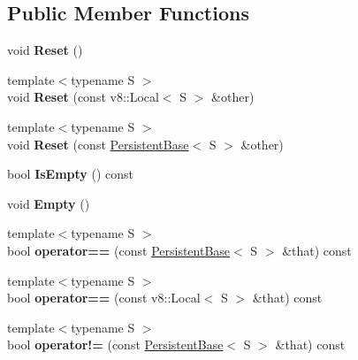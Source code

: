 \subsection*{Public Member Functions}
\begin{DoxyCompactItemize}
\item 
\mbox{\label{class_persistent_base_aea3d2d04de88357b7823be9eb788a3fa}} 
void {\bfseries Reset} ()
\item 
\mbox{\label{class_persistent_base_ac8f10d732a311ec697eb47d965789445}} 
{\footnotesize template$<$typename S $>$ }\\void {\bfseries Reset} (const v8\+::\+Local$<$ S $>$ \&other)
\item 
\mbox{\label{class_persistent_base_ae9b297f9d5ff18114d7a6608f5424d47}} 
{\footnotesize template$<$typename S $>$ }\\void {\bfseries Reset} (const \hyperlink{class_persistent_base}{Persistent\+Base}$<$ S $>$ \&other)
\item 
\mbox{\label{class_persistent_base_ac4ba73f6261d418d97f8b106a7f5e980}} 
bool {\bfseries Is\+Empty} () const
\item 
\mbox{\label{class_persistent_base_a02b30a3b00fca9d562a11b72b1ffd1b0}} 
void {\bfseries Empty} ()
\item 
\mbox{\label{class_persistent_base_acc2c0a9b3aecdda97e97aee7e307c72f}} 
{\footnotesize template$<$typename S $>$ }\\bool {\bfseries operator==} (const \hyperlink{class_persistent_base}{Persistent\+Base}$<$ S $>$ \&that) const
\item 
\mbox{\label{class_persistent_base_a7c7601829fc6470b3cb0fccd12c78c1a}} 
{\footnotesize template$<$typename S $>$ }\\bool {\bfseries operator==} (const v8\+::\+Local$<$ S $>$ \&that) const
\item 
\mbox{\label{class_persistent_base_a04e33fd01ed8ee4b4efe05e866f577bc}} 
{\footnotesize template$<$typename S $>$ }\\bool {\bfseries operator!=} (const \hyperlink{class_persistent_base}{Persistent\+Base}$<$ S $>$ \&that) const

\end{DoxyCompactItemize}
